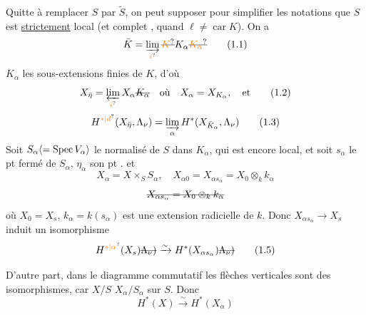 Quitte à remplacer $S$ par $\widetilde S$, on peut supposer pour simplifier les notations que $S$ est \uline{strictement}  local (et  complet  \unsure{\dots}, quand $\ell\ne\operatorname{car}K$). On a
\[
\bar K=\varinjlim_{\unsure{i}}\deleted{\unsure{K}}K_\alpha\deleted{\unsure{K_\alpha}}
\tag*{(1.1)}
\]
$K_\alpha$ les sous-extensions finies de $K$, d'où
\[
X_{\bar\eta}=\varprojlim_{\unsure{i}}X_\alpha\deleted{K_\alpha}\quad\text{où}\quad X_\alpha=X_{K_\alpha},\quad\text{et}
\tag*{(1.2)}
\]
\[
H^{\unsure{*|d}}(X_{\bar\eta},\Lambda_\nu)=\varinjlim_\alpha H^*(X_{\bar K_\alpha},\Lambda_\nu)
\tag*{(1.3)}
\]
Soit $S_\alpha\inserted{=\operatorname{Spec}V_\alpha}$ le normalisé de $S$ dans $K_\alpha$, qui est encore  local,  et soit $s_\alpha$ le pt fermé de $S_\alpha$, $\eta_\alpha$ son pt .  et
\[
X_\alpha=X\times_S S_\alpha,\quad X_{\alpha0}=X_{\alpha s_\alpha}=X_0\otimes_k k_\alpha
\tag*{(1.4)}
\]
\[
\deleted{X_{\alpha s_\alpha}=X_0\otimes_k k_\alpha}
\]
où $X_0=X_s$,  $k_\alpha=k(s_\alpha)$ est une extension  radicielle de $k$. Donc $X_{\alpha s_\alpha}\longrightarrow X_s$ induit un isomorphisme
\[
H^{\unsure{*|\alpha}}(X_s)\deleted{\Lambda_\nu)}\xrightarrow{\sim}H^*(X_{\alpha s_\alpha})\deleted{\Lambda_\nu)}
\tag*{(1.5)}
\]

D'autre part,  dans le diagramme commutatif
les flèches verticales sont  des isomorphismes, car $X/S$  $X_\alpha/S_\alpha$  sur $S$. Donc
\[
H^*(X)\xrightarrow{\sim}H^*(X_\alpha)
\tag*{(1.7)}
\]

